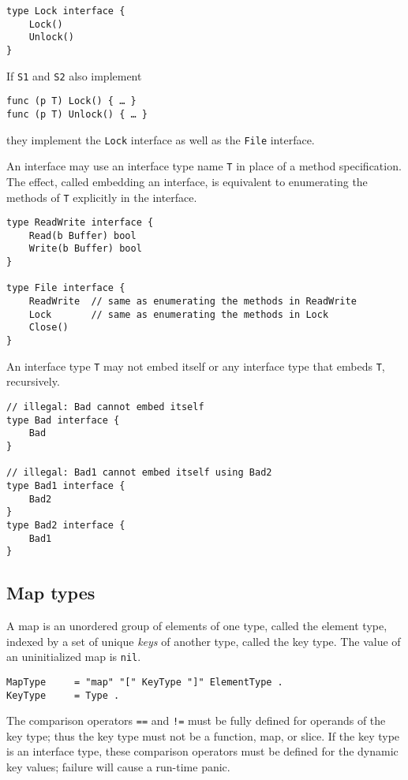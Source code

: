 \begin{Verbatim}[frame=single]
type Lock interface {
    Lock()
    Unlock()
}
\end{Verbatim}

If \texttt{S1} and \texttt{S2} also implement

\begin{Verbatim}[frame=single]
func (p T) Lock() { … }
func (p T) Unlock() { … }
\end{Verbatim}

they implement the \texttt{Lock} interface as well as the \texttt{File}
interface.

An interface may use an interface type name \texttt{T} in place of a
method specification. The effect, called embedding an interface, is
equivalent to enumerating the methods of \texttt{T} explicitly in the
interface.

\begin{Verbatim}[frame=single]
type ReadWrite interface {
    Read(b Buffer) bool
    Write(b Buffer) bool
}

type File interface {
    ReadWrite  // same as enumerating the methods in ReadWrite
    Lock       // same as enumerating the methods in Lock
    Close()
}
\end{Verbatim}

An interface type \texttt{T} may not embed itself or any interface type
that embeds \texttt{T}, recursively.

\begin{Verbatim}[frame=single]
// illegal: Bad cannot embed itself
type Bad interface {
    Bad
}

// illegal: Bad1 cannot embed itself using Bad2
type Bad1 interface {
    Bad2
}
type Bad2 interface {
    Bad1
}
\end{Verbatim}

\subsection*{Map types}

A map is an unordered group of elements of one type, called the element
type, indexed by a set of unique \emph{keys} of another type, called the
key type. The value of an uninitialized map is \texttt{nil}.

\begin{Verbatim}[frame=single]
MapType     = "map" "[" KeyType "]" ElementType .
KeyType     = Type .
\end{Verbatim}

The comparison operators \texttt{==} and \texttt{!=} must be fully
defined for operands of the key type; thus the key type must not be a
function, map, or slice. If the key type is an interface type, these
comparison operators must be defined for the dynamic key values; failure
will cause a run-time panic.


